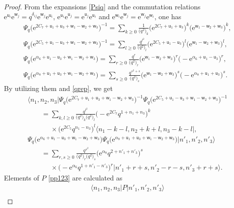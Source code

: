 \documentclass[pdftex]{sigma}
\newcommand{\e}{{\mathrm e}}
\newcommand{\uu}{{\mathsf u}}
\newcommand{\ww}{{\mathsf w}}
\numberwithin{equation}{section}
\begin{document}
\begin{proof}
From the expansions \eqref{Psiq} and
the commutation relations $\e^{\uu_i} \e^{\ww_j}=q^{\delta_{ij}}\e^{\ww_j}\e^{\uu_i}$,
$\e^{\uu_i}\e^{\uu_j}=\e^{\uu_j}\e^{\uu_i}$ and $\e^{\ww_i}\e^{\ww_j}=\e^{\ww_j}\e^{\ww_i}$, one has
\begin{gather*}
\Psi_q\bigl(\e^{2C_7+\uu_1+\uu_3+\ww_1-\ww_2+\ww_3}\bigr)^{-1}=\sum_{k\ge 0}\frac{1}{\bigl(q^2\bigr)_k}
\bigl(\e^{2C_7+\uu_1+\uu_3}\bigr)^k\bigl(\e^{\ww_1-\ww_2+\ww_3}\bigr)^k,
\\
\Psi_q\bigl(\e^{2C_5+\uu_1-\uu_3+\ww_1-\ww_2+\ww_3}\bigr)^{-1} = \sum_{l \ge 0}\frac{q^{l^2}}{\bigl(q^2\bigr)_l}
\bigl(\e^{2C_5+\uu_1-\uu_3}\bigr)^l\bigl(\e^{\ww_1-\ww_2+\ww_3}\bigr)^l,
\\
\Psi_q(\e^{\alpha_6+\uu_1-\uu_3+\ww_1-\ww_2+\ww_3}\bigr) = \sum_{r\ge 0}\frac{q^r}{\bigl(q^2\bigr)_r}
\bigl(\e^{\ww_1-\ww_2+\ww_3}\bigr)^r\bigl(-\e^{\alpha_6+\uu_1-\uu_3}\bigr)^r,
\\
\Psi_q\bigl(\e^{\alpha_8+\uu_1+\uu_3+\ww_1-\ww_2+\ww_3}\bigr)
 = \sum_{s\ge 0}\frac{q^{s^2+s}}{\bigl(q^2\bigr)_s}
\bigl(\e^{\ww_1-\ww_2+\ww_3}\bigr)^s\bigl(-\e^{\alpha_8+\uu_1+\uu_3}\bigr)^s.
\end{gather*}
By utilizing them and \eqref{qrep}, we get
\begin{gather}
\langle n_1, n_2, n_3| \Psi_q\bigl(\e^{2C_7+\uu_1+\uu_3+\ww_1-\ww_2+\ww_3}\bigr)^{-1}\Psi_q\bigl(\e^{2C_5+\uu_1-\uu_3+\ww_1-\ww_2+\ww_3}\bigr)^{-1}
\nonumber\\
\qquad= \sum_{k,l\ge 0}\frac{q^{l^2}}{\bigl(q^2\bigr)_k\bigl(q^2\bigr)_l}
\bigl(-\e^{2C_7}q^{1+n_1+n_3}\bigr)^k\nonumber\\
\phantom{\qquad= }{}\times\bigl(\e^{2C_5}q^{n_1-n_3}\bigr)^l
\langle n_1-k-l, n_2+k+l, n_3-k-l|,
\label{npp}\\
\Psi_q\bigl(\e^{\alpha_6+\uu_1-\uu_3+\ww_1-\ww_2+\ww_3}\bigr) \Psi_q\bigl(\e^{\alpha_8+\uu_1+\uu_3+\ww_1-\ww_2+\ww_3}\bigr) \bigl| n'_1, n'_2, n'_3\bigr\rangle
\nonumber\\
\qquad=\sum_{r,s\ge 0}\frac{q^{s^2}}{\bigl(q^2\bigr)_r\bigl(q^2\bigr)_s}
\bigl(\e^{\alpha_8}q^{2+n'_1+n'_3}\bigr)^s\nonumber\\
\phantom{\qquad=}{}\times\bigl(-\e^{\alpha_6}q^{1+n'_1-n'_3}\bigr)^r
\bigl|n'_1+r+s, n'_2-r-s, n'_3+r+s\bigr\rangle.
\label{ppn}
\end{gather}
Elements of $P$ \eqref{pp123} are calculated as
\begin{gather}
\langle n_1,n_2,n_3 | P \bigl|n'_1, n'_2, n'_3\bigr\rangle
\nonumber \\

\end{gather}
\end{proof}
\end{document}
